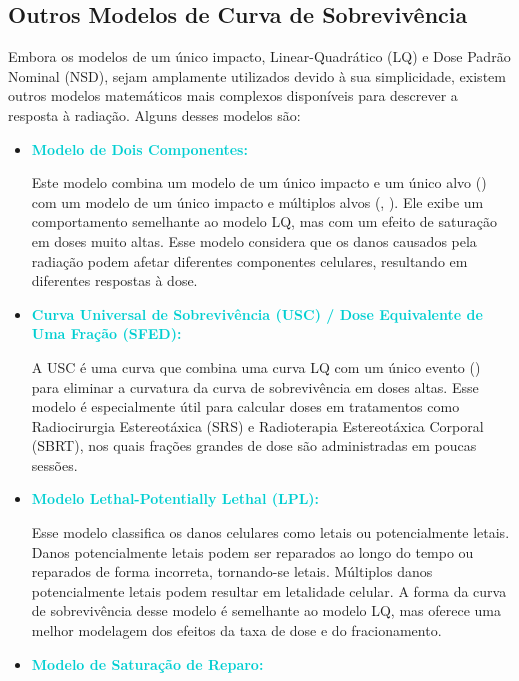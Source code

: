 \documentclass[11pt,a4paper]{article}
\begin{document}
\subsection{Outros Modelos de Curva de Sobrevivência}

	Embora os modelos de um único impacto, Linear-Quadrático (LQ) e Dose Padrão Nominal (NSD), sejam amplamente utilizados devido à sua simplicidade, existem outros modelos matemáticos mais complexos disponíveis para descrever a resposta à radiação. Alguns desses modelos são:


	\begin{itemize}
		\item \textcolor{DarkTurquoise}{\textbf{Modelo de Dois Componentes:}}
		
		Este modelo combina um modelo de um único impacto e um único alvo () com um modelo de um único impacto e múltiplos alvos (, ). Ele exibe um comportamento semelhante ao modelo LQ, mas com um efeito de saturação em doses muito altas. Esse modelo considera que os danos causados pela radiação podem afetar diferentes componentes celulares, resultando em diferentes respostas à dose.
		
		\item \textcolor{DarkTurquoise}{\textbf{Curva Universal de Sobrevivência (USC) / Dose Equivalente de Uma Fração (SFED):}}
		
		A USC é uma curva que combina uma curva LQ com um único evento () para eliminar a curvatura da curva de sobrevivência em doses altas. Esse modelo é especialmente útil para calcular doses em tratamentos como Radiocirurgia Estereotáxica (SRS) e Radioterapia Estereotáxica Corporal (SBRT), nos quais frações grandes de dose são administradas em poucas sessões.
		
		\item \textcolor{DarkTurquoise}{\textbf{Modelo Lethal-Potentially Lethal (LPL):}}
		
		Esse modelo classifica os danos celulares como letais ou potencialmente letais. Danos potencialmente letais podem ser reparados ao longo do tempo ou reparados de forma incorreta, tornando-se letais. Múltiplos danos potencialmente letais podem resultar em letalidade celular. A forma da curva de sobrevivência desse modelo é semelhante ao modelo LQ, mas oferece uma melhor modelagem dos efeitos da taxa de dose e do fracionamento.
		
		\item \textcolor{DarkTurquoise}{\textbf{Modelo de Saturação de Reparo:}}
		

\end{itemize}
\end{document}
